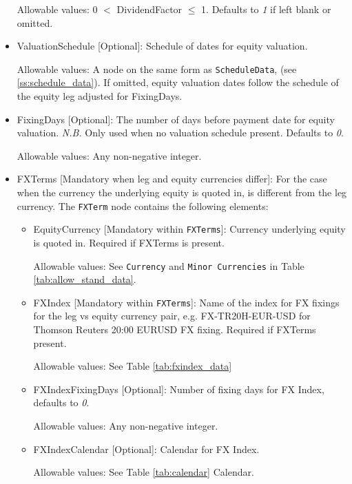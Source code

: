 \begin{itemize}
Allowable values: 0 $<$ DividendFactor $\leq$  1.   Defaults to \emph{1} if left blank or omitted.

\item ValuationSchedule [Optional]: Schedule of dates for equity valuation.

Allowable values: A node on the same form as \lstinline!ScheduleData!, (see \ref{ss:schedule_data}). If omitted, equity valuation dates follow the schedule of the equity leg adjusted for FixingDays.

\item FixingDays [Optional]: The number of days before payment date for equity valuation. \emph{N.B.} Only used when no valuation schedule present. Defaults to \emph{0}.

Allowable values: Any non-negative integer.

\item FXTerms [Mandatory when leg and equity currencies differ]: For the case when the currency  the underlying equity is quoted in, is different from the leg currency.  The \lstinline!FXTerm! node contains the following elements:
\begin{itemize}
	\item EquityCurrency [Mandatory within \lstinline!FXTerms!]: Currency underlying equity is quoted in. Required if FXTerms is present.

	Allowable values: See \lstinline!Currency! and \lstinline!Minor Currencies! in Table \ref{tab:allow_stand_data}.

	\item FXIndex [Mandatory within \lstinline!FXTerms!]: Name of the index for FX fixings for the leg vs equity currency pair, e.g. FX-TR20H-EUR-USD for Thomson Reuters 20:00 EURUSD FX fixing. Required if FXTerms present.

	Allowable values:  See Table \ref{tab:fxindex_data}

	\item FXIndexFixingDays [Optional]: Number of fixing days for FX Index, defaults to \emph{0}.

	Allowable values: Any non-negative integer.

	\item FXIndexCalendar [Optional]: Calendar for FX Index.

	Allowable values: See Table \ref{tab:calendar} Calendar.
\end{itemize}
\end{itemize}

